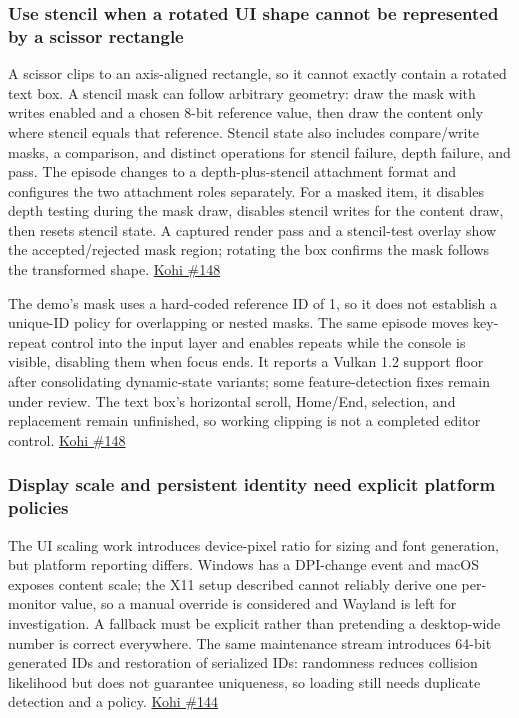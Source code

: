 \subsubsection{Use stencil when a rotated UI shape cannot be represented by a scissor rectangle}\label{use-stencil-when-a-rotated-ui-shape-cannot-be-represented-by-a-scissor-rectangle}

A scissor clips to an axis-aligned rectangle, so it cannot exactly contain a rotated text box. A stencil mask can follow arbitrary geometry: draw the mask with writes enabled and a chosen 8-bit reference value, then draw the content only where stencil equals that reference. Stencil state also includes compare/write masks, a comparison, and distinct operations for stencil failure, depth failure, and pass. The episode changes to a depth-plus-stencil attachment format and configures the two attachment roles separately. For a masked item, it disables depth testing during the mask draw, disables stencil writes for the content draw, then resets stencil state. A captured render pass and a stencil-test overlay show the accepted/rejected mask region; rotating the box confirms the mask follows the transformed shape. \href{https://www.youtube.com/watch?v=_VDD8wzUMuY}{Kohi \#148}

The demo's mask uses a hard-coded reference ID of 1, so it does not establish a unique-ID policy for overlapping or nested masks. The same episode moves key-repeat control into the input layer and enables repeats while the console is visible, disabling them when focus ends. It reports a Vulkan 1.2 support floor after consolidating dynamic-state variants; some feature-detection fixes remain under review. The text box's horizontal scroll, Home/End, selection, and replacement remain unfinished, so working clipping is not a completed editor control. \href{https://www.youtube.com/watch?v=_VDD8wzUMuY}{Kohi \#148}

\subsubsection{Display scale and persistent identity need explicit platform policies}\label{display-scale-and-persistent-identity-need-explicit-platform-policies}

The UI scaling work introduces device-pixel ratio for sizing and font generation, but platform reporting differs. Windows has a DPI-change event and macOS exposes content scale; the X11 setup described cannot reliably derive one per-monitor value, so a manual override is considered and Wayland is left for investigation. A fallback must be explicit rather than pretending a desktop-wide number is correct everywhere. The same maintenance stream introduces 64-bit generated IDs and restoration of serialized IDs: randomness reduces collision likelihood but does not guarantee uniqueness, so loading still needs duplicate detection and a policy. \href{https://www.youtube.com/watch?v=YCYZtc2PrtY}{Kohi \#144}

